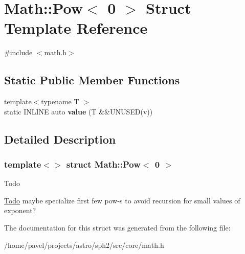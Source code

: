 \hypertarget{structMath_1_1Pow_3_010_01_4}{}\section{Math\+:\+:Pow$<$ 0 $>$ Struct Template Reference}
\label{structMath_1_1Pow_3_010_01_4}


{\ttfamily \#include $<$math.\+h$>$}

\subsection*{Static Public Member Functions}
\begin{DoxyCompactItemize}
\item 
\hypertarget{structMath_1_1Pow_3_010_01_4_adf20cf05e7a5795a759085c9ee373c62}{}\label{structMath_1_1Pow_3_010_01_4_adf20cf05e7a5795a759085c9ee373c62} 
{\footnotesize template$<$typename T $>$ }\\static I\+N\+L\+I\+NE auto {\bfseries value} (T \&\&U\+N\+U\+S\+ED(v))
\end{DoxyCompactItemize}


\subsection{Detailed Description}
\subsubsection*{template$<$$>$\newline
struct Math\+::\+Pow$<$ 0 $>$}

\begin{DoxyRefDesc}{Todo}
\item[\hyperlink{todo__todo000004}{Todo}]maybe specialize first few pow-\/s to avoid recursion for small values of exponent? \end{DoxyRefDesc}


The documentation for this struct was generated from the following file\+:\begin{DoxyCompactItemize}
\item 
/home/pavel/projects/astro/sph2/src/core/math.\+h\end{DoxyCompactItemize}
